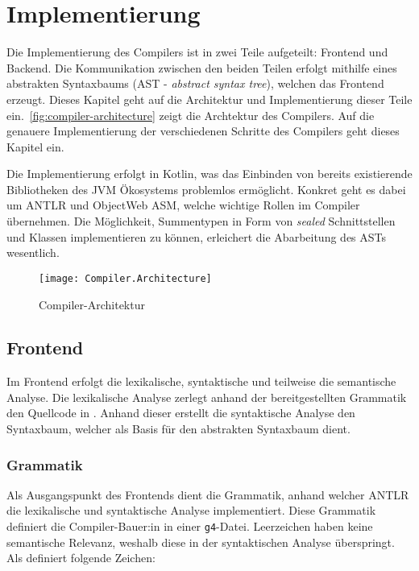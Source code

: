 \chapter{Implementierung}
\label{cha:implementation}

Die Implementierung des Compilers ist in zwei Teile aufgeteilt: Frontend und Backend. Die Kommunikation zwischen den beiden Teilen erfolgt mithilfe eines abstrakten Syntaxbaums (AST - \textit{abstract syntax tree}), welchen das Frontend erzeugt. Dieses Kapitel geht  auf die Architektur und Implementierung dieser Teile ein.~\autoref{fig:compiler-architecture} zeigt die Archtektur des \toya Compilers. Auf die genauere Implementierung der verschiedenen Schritte des Compilers geht dieses Kapitel ein.

Die Implementierung erfolgt in Kotlin, was das Einbinden von bereits existierende Bibliotheken des JVM Ökosystems problemlos ermöglicht. Konkret geht es dabei um ANTLR und ObjectWeb ASM, welche wichtige Rollen im Compiler übernehmen. Die Möglichkeit, Summentypen in Form von \textit{sealed} Schnittstellen und Klassen implementieren zu können, erleichert die Abarbeitung des ASTs wesentlich.

\begin{figure}[h]
    \caption{Compiler-Architektur}
    \centering
    \texttt{[image: Compiler.Architecture]}
    \label{fig:compiler-architecture}
\end{figure}

\section{Frontend}

Im Frontend erfolgt die lexikalische, syntaktische und teilweise die semantische Analyse. Die lexikalische Analyse zerlegt anhand der bereitgestellten Grammatik den Quellcode in \token. Anhand dieser \token erstellt die syntaktische Analyse den Syntaxbaum, welcher als Basis für den abstrakten Syntaxbaum dient.

\subsection{Grammatik}

Als Ausgangspunkt des Frontends dient die Grammatik, anhand welcher ANTLR die lexikalische und syntaktische Analyse implementiert. Diese Grammatik definiert die Compiler-Bauer:in in einer \texttt{g4}-Datei. Leerzeichen haben keine semantische Relevanz, weshalb \toya diese in der syntaktischen Analyse überspringt. Als \token definiert \toya folgende Zeichen:

